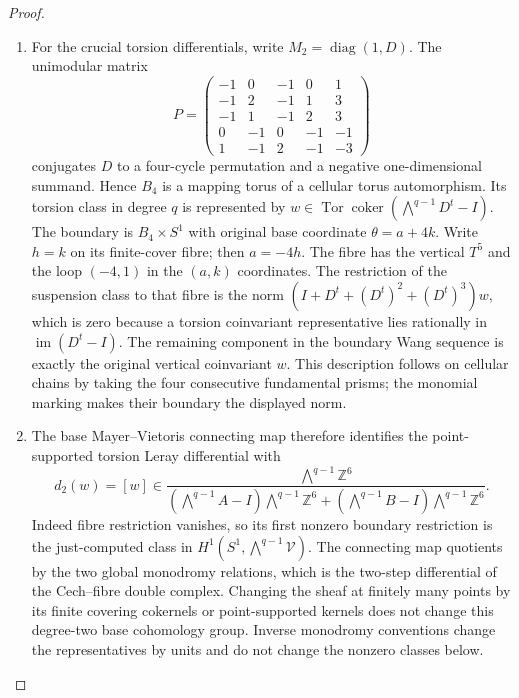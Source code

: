 \documentclass[11pt,a4paper]{article}
\theoremstyle{definition}
\begin{document}
\begin{proof}
\begin{enumerate}[label=\arabic*.]
\item For the crucial torsion differentials, write
$M_2=\operatorname{diag}(1,D)$.  The unimodular matrix
\[
P=\begin{pmatrix}
-1&0&-1&0&1\\-1&2&-1&1&3\\-1&1&-1&2&3\\
0&-1&0&-1&-1\\1&-1&2&-1&-3
\end{pmatrix}
\]
conjugates $D$ to a four-cycle permutation and a negative
one-dimensional summand.  Hence $B_4$ is a mapping torus of
a cellular torus automorphism.  Its torsion class in degree
$q$ is represented by
$w\in\operatorname{Tor}\operatorname{coker}
(\bigwedge^{q-1}D^t-I)$.
The boundary is $B_4\times S^1$ with original base coordinate
$\theta=a+4k$.  Write $h=k$ on its finite-cover fibre; then
$a=-4h$.  The fibre has the vertical $T^5$ and the loop
$(-4,1)$ in the $(a,k)$ coordinates.
The restriction of the suspension class to that fibre is
the norm $(I+D^t+(D^t)^2+(D^t)^3)w$, which is zero because
a torsion coinvariant representative lies rationally in
$\operatorname{im}(D^t-I)$.
The remaining component in the boundary Wang sequence is
exactly the original vertical coinvariant $w$.
This description follows on cellular chains by taking the
four consecutive fundamental prisms; the monomial marking
makes their boundary the displayed norm.

\item The base Mayer--Vietoris connecting map therefore identifies
the point-supported torsion Leray differential with
\[
d_2(w)=[w]\in
\frac{\bigwedge^{q-1}\mathbb Z^6}
 {(\bigwedge^{q-1}A-I)\bigwedge^{q-1}\mathbb Z^6+
  (\bigwedge^{q-1}B-I)\bigwedge^{q-1}\mathbb Z^6}.
\tag{F.6}\label{maps:eq:F.6}
\]
Indeed fibre restriction vanishes, so its first nonzero
boundary restriction is the just-computed class in
$H^1(S^1,\bigwedge^{q-1}\mathcal V)$.
The connecting map quotients by the two global monodromy
relations, which is the two-step differential of the
Cech--fibre double complex.
Changing the sheaf at finitely many points by its finite
covering cokernels or point-supported kernels does not
change this degree-two base cohomology group.
Inverse monodromy conventions change the representatives
by units and do not change the nonzero classes below.


\end{enumerate}
\end{proof}
\end{document}
